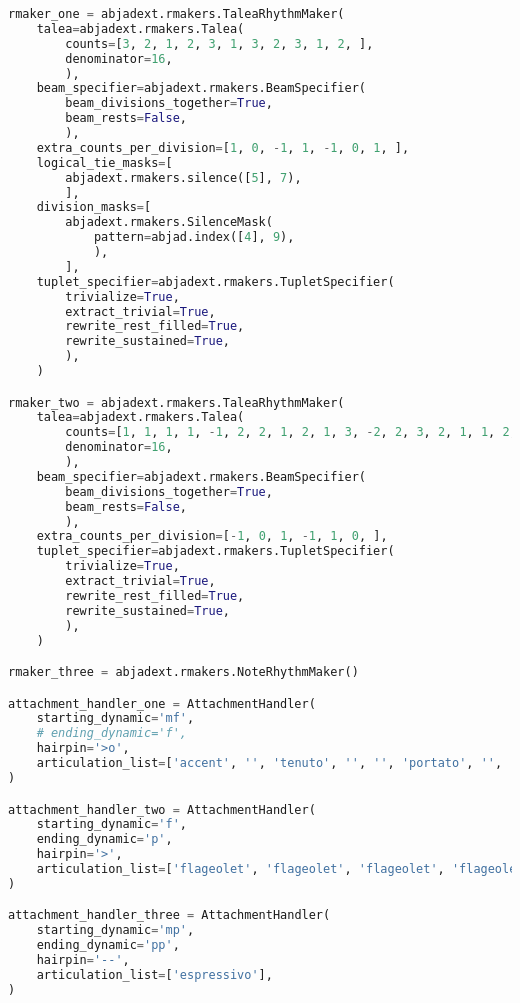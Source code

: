 \begin{lstlisting}[language=Python, caption=Invocation Source Code]
rmaker_one = abjadext.rmakers.TaleaRhythmMaker(
    talea=abjadext.rmakers.Talea(
        counts=[3, 2, 1, 2, 3, 1, 3, 2, 3, 1, 2, ],
        denominator=16,
        ),
    beam_specifier=abjadext.rmakers.BeamSpecifier(
        beam_divisions_together=True,
        beam_rests=False,
        ),
    extra_counts_per_division=[1, 0, -1, 1, -1, 0, 1, ],
    logical_tie_masks=[
        abjadext.rmakers.silence([5], 7),
        ],
    division_masks=[
        abjadext.rmakers.SilenceMask(
            pattern=abjad.index([4], 9),
            ),
        ],
    tuplet_specifier=abjadext.rmakers.TupletSpecifier(
        trivialize=True,
        extract_trivial=True,
        rewrite_rest_filled=True,
        rewrite_sustained=True,
        ),
    )

rmaker_two = abjadext.rmakers.TaleaRhythmMaker(
    talea=abjadext.rmakers.Talea(
        counts=[1, 1, 1, 1, -1, 2, 2, 1, 2, 1, 3, -2, 2, 3, 2, 1, 1, 2, -1, 1, 1, 3, ],
        denominator=16,
        ),
    beam_specifier=abjadext.rmakers.BeamSpecifier(
        beam_divisions_together=True,
        beam_rests=False,
        ),
    extra_counts_per_division=[-1, 0, 1, -1, 1, 0, ],
    tuplet_specifier=abjadext.rmakers.TupletSpecifier(
        trivialize=True,
        extract_trivial=True,
        rewrite_rest_filled=True,
        rewrite_sustained=True,
        ),
    )

rmaker_three = abjadext.rmakers.NoteRhythmMaker()

attachment_handler_one = AttachmentHandler(
    starting_dynamic='mf',
    # ending_dynamic='f',
    hairpin='>o',
    articulation_list=['accent', '', 'tenuto', '', '', 'portato', '', '', '', ],
)

attachment_handler_two = AttachmentHandler(
    starting_dynamic='f',
    ending_dynamic='p',
    hairpin='>',
    articulation_list=['flageolet', 'flageolet', 'flageolet', 'flageolet', 'flageolet', 'halfopen', 'halfopen', 'halfopen', '', '', '', '', 'halfopen', 'flageolet', '', '', '', 'stopped', 'stopped', 'stopped', 'stopped',  '', 'halfopen', 'flageolet', 'halfopen', 'halfopen', 'halfopen', '', '', '', '', '', 'stopped', 'stopped', 'stopped', '', '', '', '',],
)

attachment_handler_three = AttachmentHandler(
    starting_dynamic='mp',
    ending_dynamic='pp',
    hairpin='--',
    articulation_list=['espressivo'],
)


\end{lstlisting}
